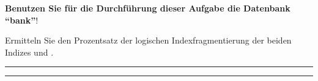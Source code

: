 \item \textbf{Benutzen Sie für die Durchführung dieser Aufgabe die
Datenbank \enquote{bank}}!

Ermitteln Sie den Prozentsatz der logischen Indexfragmentierung der beiden
Indizes  und .

\rule{0.94\textwidth}{0.5pt}

\rule{0.94\textwidth}{0.5pt}
